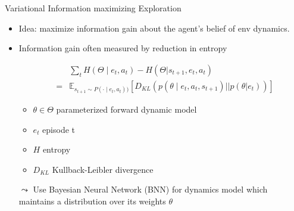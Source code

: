 \begin{frame}[c]{Variational Information maximizing Exploration~}
	
	\begin{itemize}
		\item Idea: maximize information gain about the agent's belief of env dynamics.
		\item Information gain often measured by reduction in entropy
		
		\begin{eqnarray}
		&&\sum_t H(\Theta \mid e_t, a_t) - H(\Theta | s_{t+1}, e_t, a_t)\nonumber\\
		&=& \mathbb{E}_{s_{t+1}\sim P(\cdot\mid e_t, a_t))} \left[ D_{KL} (p(\theta \mid e_t, a_t, s_{t+1}) || p(\theta|e_t))  \right]\nonumber
		\end{eqnarray}
		
		\begin{itemize}
			\item $\theta \in \Theta$ parameterized forward dynamic model
			\item $e_t$ episode t
			\item $H$ entropy
			\item $D_{KL}$ Kullback-Leibler divergence
		\end{itemize}
	
		\item[$\leadsto$] Use Bayesian Neural Network (BNN) for dynamics model which maintains a distribution over its weights $\theta$
		
	\end{itemize}


	
	
\end{frame}

